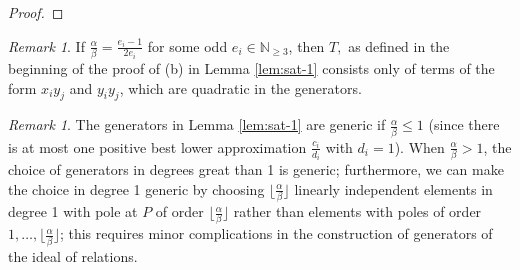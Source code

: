 \documentclass{amsart}
\theoremstyle{plain}
\theoremstyle{definition}
\theoremstyle{remark}
\newtheorem{rem}[thm]{Remark}
\numberwithin{equation}{section}
\begin{document}
\begin{proof}



\end{proof}

\begin{rem}\label{rem:quad-gen}
If $\frac{\alpha}{\beta}=\frac{e_i-1}{2 e_i}$ for some odd $e_i\in \mathbb{N}_{\geq 3}$, then $T,$ as defined in the beginning of the proof of (b) in Lemma \ref{lem:sat-1} consists only of terms of the form $x_i y_j$ and $y_i y_j$, which are quadratic in the generators.
\end{rem}


\begin{rem}\label{rem:sat-1-gen-lem-generic}
The generators in Lemma \ref{lem:sat-1} are generic if $\frac{\alpha}{\beta}\le 1$ (since there is at most one positive best lower approximation $\frac{c_i}{d_i}$ with $d_i=1$).  When $\frac{\alpha}{\beta}>1$, the choice of generators in degrees great than 1 is generic; furthermore, we can make the choice in degree 1 generic by choosing $\lfloor \frac{\alpha}{\beta}\rfloor$ linearly independent elements in degree 1 with pole at $P$ of order $\lfloor \frac{\alpha}{\beta}\rfloor$ rather than elements with poles of order $1, \ldots, \lfloor \frac{\alpha}{\beta}\rfloor$; this requires minor complications in the construction of generators of the ideal of relations.
\end{rem}
\end{document}
